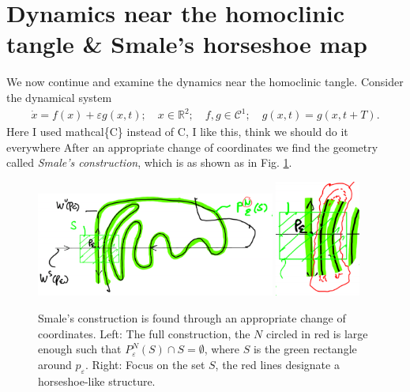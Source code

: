 \section{Dynamics near the homoclinic tangle \& Smale's horseshoe map}
We now continue and examine the dynamics near the homoclinic tangle. Consider the dynamical system
\begin{align}
	\dot{x} = f(x) + \varepsilon g(x,t);\quad x \in \mathbb{R}^{2};\quad f,g \in  \mathcal{C}^{1};\quad g(x,t) = g(x,t+T).
\end{align}
{\color{blue} Here I used mathcal\{C\} instead of C, I like this, think we should do it everywhere}
After an appropriate change of coordinates we find the geometry called \emph{Smale's construction}, which is as shown as in Fig. \ref{fig:smales_construction}.
\begin{figure}[h!]
	\centering
	\includegraphics[width=0.7\textwidth]{figures/ch6/16smales_construction1.png}
	\hspace{0.03\textwidth}
	\includegraphics[width=0.25\textwidth]{figures/ch6/16smales_construction2.png}
	\caption{Smale's construction is found through an appropriate change of coordinates. Left: The full construction, the $N$ circled in red is large enough such that $P^{N}_{\varepsilon}(S)\cap S = \emptyset$, where $S$ is the green rectangle around $p_{\varepsilon}$. Right: Focus on the set $S$, the red lines designate a horseshoe-like structure.}
	\label{fig:smales_construction}
\end{figure}


